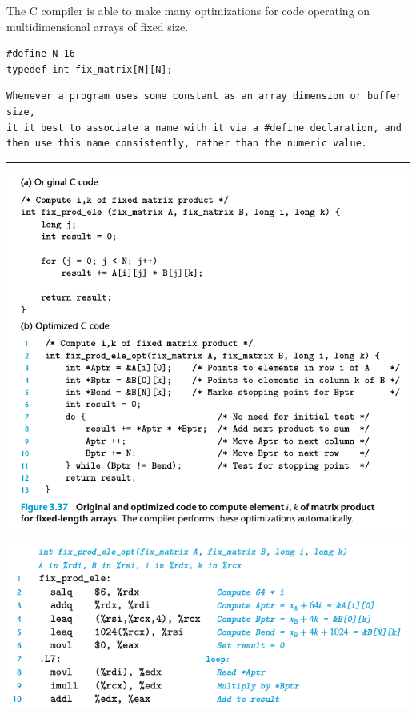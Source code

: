 \documentclass[11pt]{article}
\begin{document}
The C compiler is able to make many optimizations for code operating on multidimensional arrays of fixed size.\\

\begin{verbatim}
#define N 16
typedef int fix_matrix[N][N];
\end{verbatim}

\begin{verbatim}
Whenever a program uses some constant as an array dimension or buffer size, 
it it best to associate a name with it via a #define declaration, and 
then use this name consistently, rather than the numeric value.
\end{verbatim}

\noindent\rule{\textwidth}{0.5pt}
\begin{center}
\includegraphics[width=.9\linewidth]{pics/original-and-optimized-code-for-fixed-length-arrays.png}
\end{center}

\begin{center}
\includegraphics[width=.9\linewidth]{pics/fixed-array-assembly-code-1.png}
\end{center}
\end{document}
